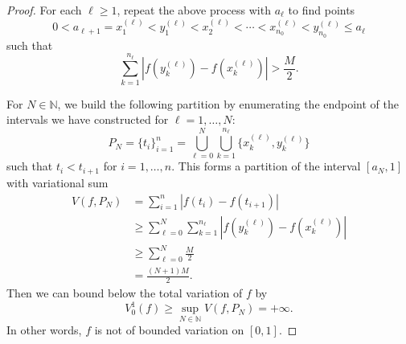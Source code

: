 \documentclass[12pt]{article}
\theoremstyle{definition}
\newcommand{\N}{\mathbb{N}}
\newcommand{\<}{\langle}
\renewcommand{\>}{\rangle}
\begin{document}
\begin{proof}
    For each $\ell \geq 1$, repeat the above process with $a_\ell$ to find points
    \[
        0 < a_{\ell+1} = x_1^{(\ell)} < y_1^{(\ell)} < x_2^{(\ell)} < \cdots < x_{n_0}^{(\ell)} < y_{n_0}^{(\ell)} \leq a_\ell
    \]
    such that
    \[
        \sum_{k=1}^{n_\ell} |f(y_k^{(\ell)}) - f(x_k^{(\ell)})| > \frac{M}{2}.
    \]

    For $N \in \N$, we build the following partition by enumerating the endpoint of the intervals we have constructed for $\ell = 1, \dots, N$:
    \[
        P_N
            = \{t_i\}_{i=1}^n
            = \bigcup_{\ell=0}^{N} \bigcup_{k=1}^{n_\ell} \{x_k^{(\ell)}, y_k^{(\ell)}\}
    \]
    such that $t_i < t_{i+1}$ for $i = 1, \dots, n$.
    This forms a partition of the interval $[a_N, 1]$ with variational sum
    \begin{align*}
        V(f, P_N)
            &= \sum_{i=1}^{n} |f(t_i) - f(t_{i+1})| \\
            &\geq \sum_{\ell=0}^{N} \sum_{k=1}^{n_\ell} |f(y_k^{(\ell)}) - f(x_k^{(\ell)})| \\
            &\geq \sum_{\ell=0}^{N} \frac{M}{2} \\
            &= \frac{(N + 1)M}{2}.
    \end{align*}
    Then we can bound below the total variation of $f$ by
    \[
        V_0^1(f) \geq \sup_{N \in \N} V(f, P_N) = +\infty.
    \]
    In other words, $f$ is not of bounded variation on $[0, 1]$.
\end{proof}
\end{document}
